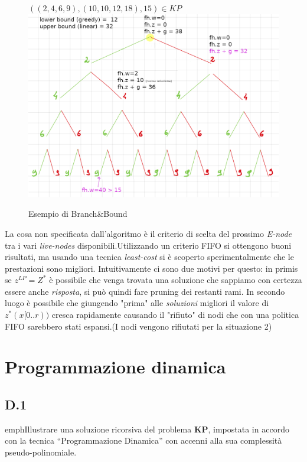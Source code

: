 \documentclass[a4paper]{article}
\begin{document}
\begin{adjustwidth}{.8cm}{0cm}
\begin{itemize}
	\end{itemize}
	\begin{figure}[!ht]
\centering
\textbf{$((2,4,6,9),(10,10,12,18),15) \in KP$}
\includegraphics[width=1\textwidth]{./img/C14_BB_manuale.png}
\caption{Esempio di Branch\&Bound} \label{FIG:C14_BB_manuale}
\end{figure}
	La cosa non specificata dall'algoritmo è il criterio di scelta del prossimo \textit{E-node} tra i vari \textit{live-nodes} disponibili.Utilizzando un criterio FIFO si ottengono buoni risultati, ma usando una tecnica \emph{least-cost} si è scoperto sperimentalmente che le prestazioni sono migliori.
	Intuitivamente ci sono due motivi per questo: in primis se $z^{LP} = Z^*$ è possibile che venga trovata una soluzione che sappiamo con certezza essere anche \textit{risposta}, si può quindi fare pruning dei restanti rami.
	In secondo luogo è possibile che giungendo "prima" alle \textit{soluzioni} migliori il valore di $z^*(x[0..r))$ cresca rapidamente causando il "rifiuto" di nodi che con una politica FIFO sarebbero stati espansi.(I nodi vengono rifiutati per la situazione 2)
\end{adjustwidth}
\section{Programmazione dinamica}
\subsection{D.1}
emph{Illustrare una soluzione ricorsiva del problema \textbf{KP}, impostata in accordo con la tecnica “Programmazione Dinamica” con accenni alla sua complessità pseudo-polinomiale.}
\end{document}
